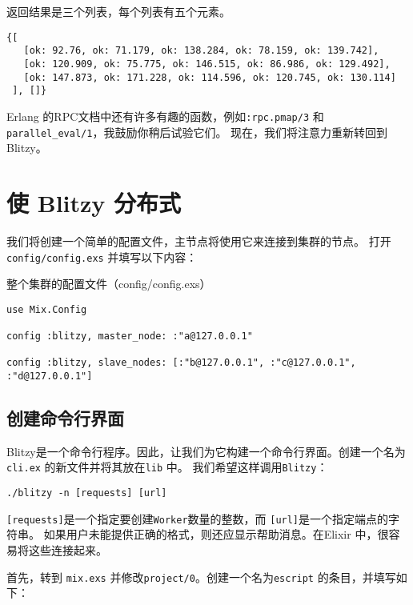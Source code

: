 返回结果是三个列表，每个列表有五个元素。

\begin{code}{}
\begin{verbatim}
{[
   [ok: 92.76, ok: 71.179, ok: 138.284, ok: 78.159, ok: 139.742],
   [ok: 120.909, ok: 75.775, ok: 146.515, ok: 86.986, ok: 129.492],
   [ok: 147.873, ok: 171.228, ok: 114.596, ok: 120.745, ok: 130.114]
 ], []}
\end{verbatim}
\end{code}

Erlang 的RPC文档中还有许多有趣的函数，例如\texttt{:rpc.pmap/3} 和\texttt{parallel\_eval/1}，我鼓励你稍后试验它们。
现在，我们将注意力重新转回到Blitzy。

\section{使 Blitzy 分布式}

我们将创建一个简单的配置文件，主节点将使用它来连接到集群的节点。
打开\texttt{config/config.exs} 并填写以下内容：

\begin{code}{整个集群的配置文件（config/config.exs）}

\begin{verbatim}
use Mix.Config

config :blitzy, master_node: :"a@127.0.0.1"

config :blitzy, slave_nodes: [:"b@127.0.0.1", :"c@127.0.0.1", :"d@127.0.0.1"]
\end{verbatim}
\end{code}

\subsection{创建命令行界面}

Blitzy是一个命令行程序。因此，让我们为它构建一个命令行界面。创建一个名为\texttt{cli.ex} 的新文件并将其放在\texttt{lib} 中。
我们希望这样调用\texttt{Blitzy}：

\texttt{./blitzy -n [requests] [url]}

\texttt{[requests]}是一个指定要创建\texttt{Worker}数量的整数，而 \texttt{[url]}是一个指定端点的字符串。
如果用户未能提供正确的格式，则还应显示帮助消息。在Elixir 中，很容易将这些连接起来。

首先，转到 \texttt{mix.exs} 并修改\texttt{project/0}。创建一个名为\texttt{escript} 的条目，并填写如下：

